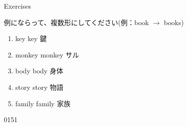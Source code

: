 \documentclass[aspectratio=169,xcolor={dvipsnames,table}]{beamer}
\newcommand{\myaudio}[1]{\href{#1}{\faVolumeUp}}
\begin{document}
\begin{frame}[plain]{Exercises}

例にならって、複数形にしてください(例：book $\longrightarrow$ books)

 \Large

\begin{enumerate}
 \item<1-> key \hfill{}{\scriptsize key  鍵}
 \item<1-> monkey \hfill{}{\scriptsize monkey  サル}
 \item<1-> body \hfill{}{\scriptsize body  身体}
 \item<1-> story \hfill{}{\scriptsize story  物語}
 \item<1-> family \hfill{}{\scriptsize family  家族}
\end{enumerate}

\hfill{\tiny 0151}\,{\scriptsize \myaudio{./audio/005_singular_plural_c.mp3}}
\end{frame}
\end{document}

